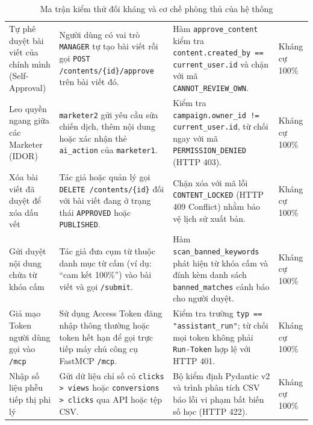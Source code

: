 \begin{table}[!htb]
\centering
\scriptsize
\renewcommand{\arraystretch}{0.94}
\caption{Ma trận kiểm thử đối kháng và cơ chế phòng thủ của hệ thống}\label{tab:adversarial-matrix}
\begin{tabularx}{\textwidth}{|L{3.1cm}|Y|L{3.2cm}|C{1.9cm}|}
\hline
{} &  &  & \\
\hline
Tự phê duyệt bài viết của chính mình (Self-Approval) & Người dùng có vai trò \texttt{MANAGER} tự tạo bài viết rồi gọi \texttt{POST /contents/\{id\}/approve} trên bài viết đó. & Hàm \texttt{approve\_content} kiểm tra \texttt{content.created\_by == current\_user.id} và chặn với mã \texttt{CANNOT\_REVIEW\_OWN}. & Kháng cự 100\%\\
\hline
Leo quyền ngang giữa các Marketer (IDOR) & \texttt{marketer2} gửi yêu cầu sửa chiến dịch, thêm nội dung hoặc xác nhận thẻ \texttt{ai\_action} của \texttt{marketer1}. & Kiểm tra \texttt{campaign.owner\_id != current\_user.id}, từ chối ngay với mã \texttt{PERMISSION\_DENIED} (HTTP 403). & Kháng cự 100\%\\
\hline
Xóa bài viết đã duyệt để xóa dấu vết & Tác giả hoặc quản lý gọi \texttt{DELETE /contents/\{id\}} đối với bài viết đang ở trạng thái \texttt{APPROVED} hoặc \texttt{PUBLISHED}. & Chặn xóa với mã lỗi \texttt{CONTENT\_LOCKED} (HTTP 409 Conflict) nhằm bảo vệ lịch sử xuất bản. & Kháng cự 100\%\\
\hline
Gửi duyệt nội dung chứa từ khóa cấm & Tác giả đưa cụm từ thuộc danh mục từ cấm (ví dụ: ``cam kết 100\%'') vào bài viết và gọi \texttt{/submit}. & Hàm \texttt{scan\_banned\_keywords} phát hiện từ khóa cấm và đính kèm danh sách \texttt{banned\_matches} cảnh báo cho người duyệt. & Kháng cự 100\%\\
\hline
Giả mạo Token người dùng gọi vào \texttt{/mcp} & Sử dụng Access Token đăng nhập thông thường hoặc token hết hạn để gọi trực tiếp máy chủ công cụ FastMCP \texttt{/mcp}. & Kiểm tra trường \texttt{typ == "assistant\_run"}; từ chối mọi token không phải \texttt{Run-Token} hợp lệ với HTTP 401. & Kháng cự 100\%\\
\hline
Nhập số liệu phễu tiếp thị phi lý & Gửi dữ liệu chỉ số có \texttt{clicks > views} hoặc \texttt{conversions > clicks} qua API hoặc tệp CSV. & Bộ kiểm định Pydantic v2 và trình phân tích CSV báo lỗi vi phạm bất biến số học (HTTP 422). & Kháng cự 100\%\\
\hline
\end{tabularx}
\end{table}


